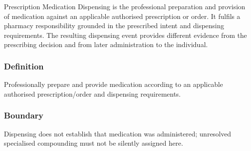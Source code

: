 Prescription Medication Dispensing is the professional preparation and provision of medication against an applicable authorised prescription or order. It fulfils a pharmacy responsibility grounded in the prescribed intent and dispensing requirements. The resulting dispensing event provides different evidence from the prescribing decision and from later administration to the individual.

\subsubsection*{Definition}

Professionally prepare and provide medication according to an applicable authorised prescription/\allowbreak{}order and dispensing requirements.

\subsubsection*{Boundary}

Dispensing does not establish that medication was administered; unresolved specialised compounding must not be silently assigned here.

